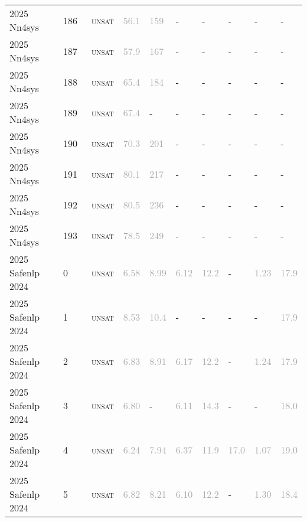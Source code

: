 \begin{center}
{\begin{longtable}{@{}llllllllll@{}}
2025 Nn4sys & 186 & ~\textsc{unsat} & \textcolor{darkgray}{56.1} & \textcolor{darkgray}{159} & - & - & - & - & - \\
2025 Nn4sys & 187 & ~\textsc{unsat} & \textcolor{darkgray}{57.9} & \textcolor{darkgray}{167} & - & - & - & - & - \\
2025 Nn4sys & 188 & ~\textsc{unsat} & \textcolor{darkgray}{65.4} & \textcolor{darkgray}{184} & - & - & - & - & - \\
2025 Nn4sys & 189 & ~\textsc{unsat} & \textcolor{darkgray}{67.4} & - & - & - & - & - & - \\
2025 Nn4sys & 190 & ~\textsc{unsat} & \textcolor{darkgray}{70.3} & \textcolor{darkgray}{201} & - & - & - & - & - \\
2025 Nn4sys & 191 & ~\textsc{unsat} & \textcolor{darkgray}{80.1} & \textcolor{darkgray}{217} & - & - & - & - & - \\
2025 Nn4sys & 192 & ~\textsc{unsat} & \textcolor{darkgray}{80.5} & \textcolor{darkgray}{236} & - & - & - & - & - \\
2025 Nn4sys & 193 & ~\textsc{unsat} & \textcolor{darkgray}{78.5} & \textcolor{darkgray}{249} & - & - & - & - & - \\
\midrule
2025 Safenlp 2024 & 0 & ~\textsc{unsat} & \textcolor{darkgray}{6.58} & \textcolor{darkgray}{8.99} & \textcolor{darkgray}{6.12} & \textcolor{darkgray}{12.2} & - & \textcolor{darkgray}{1.23} & \textcolor{darkgray}{17.9} \\
2025 Safenlp 2024 & 1 & ~\textsc{unsat} & \textcolor{darkgray}{8.53} & \textcolor{darkgray}{10.4} & - & - & - & - & \textcolor{darkgray}{17.9} \\
2025 Safenlp 2024 & 2 & ~\textsc{unsat} & \textcolor{darkgray}{6.83} & \textcolor{darkgray}{8.91} & \textcolor{darkgray}{6.17} & \textcolor{darkgray}{12.2} & - & \textcolor{darkgray}{1.24} & \textcolor{darkgray}{17.9} \\
2025 Safenlp 2024 & 3 & ~\textsc{unsat} & \textcolor{darkgray}{6.80} & - & \textcolor{darkgray}{6.11} & \textcolor{darkgray}{14.3} & - & - & \textcolor{darkgray}{18.0} \\
2025 Safenlp 2024 & 4 & ~\textsc{unsat} & \textcolor{darkgray}{6.24} & \textcolor{darkgray}{7.94} & \textcolor{darkgray}{6.37} & \textcolor{darkgray}{11.9} & \textcolor{darkgray}{17.0} & \textcolor{darkgray}{1.07} & \textcolor{darkgray}{19.0} \\
2025 Safenlp 2024 & 5 & ~\textsc{unsat} & \textcolor{darkgray}{6.82} & \textcolor{darkgray}{8.21} & \textcolor{darkgray}{6.10} & \textcolor{darkgray}{12.2} & - & \textcolor{darkgray}{1.30} & \textcolor{darkgray}{18.4} \\

\end{longtable}}
\end{center}
